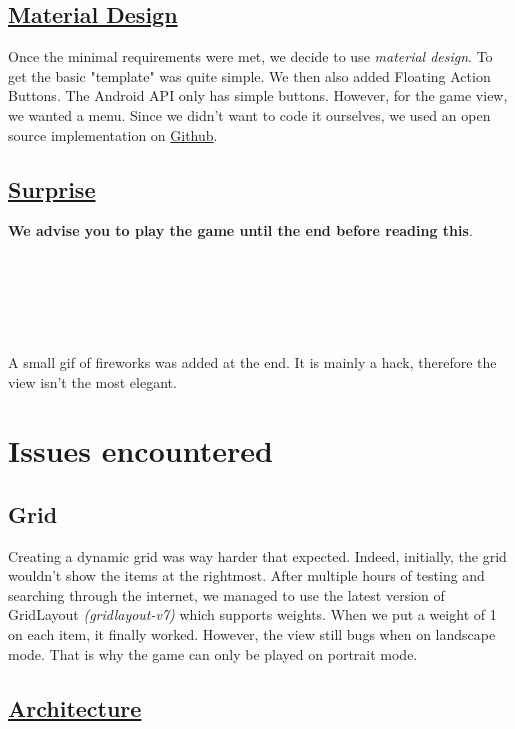 \documentclass{article}
\begin{document}
\subsection{\href{https://media.tenor.co/images/131a172b8a349afd711cd7de7ab1177a/raw}{Material Design}}

Once the minimal requirements were met, we decide to use \textit{material design}. To get the basic "template" was quite simple. We then also added Floating Action Buttons. The Android API only has simple buttons. However, for the game view, we wanted a menu. Since we didn't want to code it ourselves, we used an open source implementation on \href{https://github.com/Clans/FloatingActionButton}{Github}.

\subsection{\href{https://media.giphy.com/media/RmmUkEitovbyM/giphy.gif}{Surprise}}

\textbf{We advise you to play the game until the end before reading this}. 

\ \\ 
\ \\
\ \\
\ \\
\ \\

A small gif of fireworks was added at the end. It is mainly a hack, therefore the view isn't the most elegant. 


\section{Issues encountered}

\subsection{Grid}

Creating a dynamic grid was way harder that expected. Indeed, initially, the grid wouldn't show the items at the rightmost. After multiple hours of testing and searching through the internet, we managed to use the latest version of GridLayout \textit{(gridlayout-v7)} which supports weights. When we put a weight of 1 on each item, it finally worked. However, the view still bugs when on landscape mode. That is why the game can only be played on portrait mode.

\subsection{\href{https://media.tenor.co/images/bdbe70ee818da02b0b7e7e3fd390a9c0/raw}{Architecture}}
\end{document}
